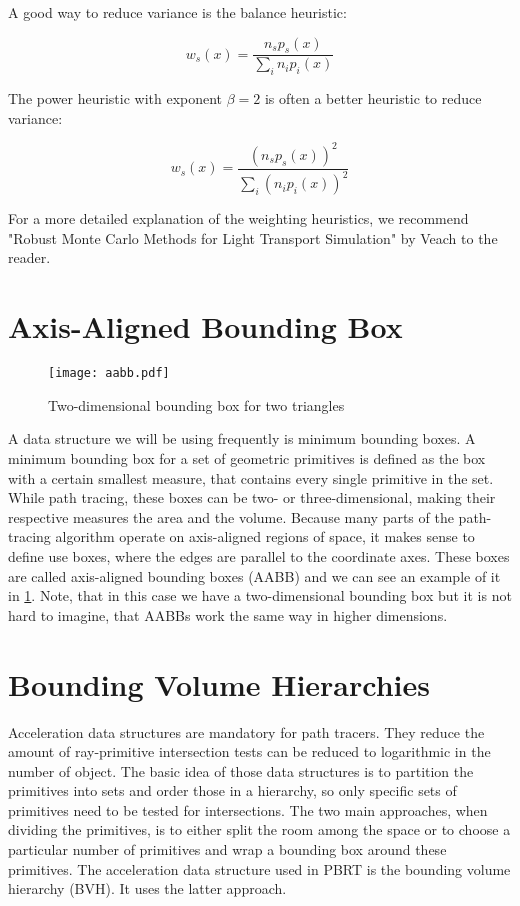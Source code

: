 A good way to reduce variance is the balance heuristic:

\begin{equation}
w_s(x) = \frac{n_s p_s(x)}{\sum_{i}n_i p_i(x)}
\end{equation}

The power heuristic with exponent $\beta = 2$ is often a better heuristic to reduce variance:

\begin{equation}
w_s(x) = \frac{(n_s p_s(x))^2}{\sum_{i}(n_i p_i(x))^2}
\end{equation}

For a more detailed explanation of the weighting heuristics, we recommend "Robust Monte Carlo Methods for Light Transport Simulation" by Veach to the reader. \cite{RMCM}

\section{Axis-Aligned Bounding Box}
\begin{figure}
	\begin{center}
		\texttt{[image: aabb.pdf]}
		\caption{Two-dimensional bounding box for two triangles}
		\label{fig:aabb}
	\end{center}
\end{figure}

A data structure we will be using frequently is minimum bounding boxes. A minimum bounding box for a set of geometric primitives is defined as the box with a certain smallest measure, that contains every single primitive in the set. While path tracing, these boxes can be two- or three-dimensional, making their respective measures the area and the volume. Because many parts of the path-tracing algorithm operate on axis-aligned regions of space, it makes sense to define use boxes, where the edges are parallel to the coordinate axes. These boxes are called axis-aligned bounding boxes (AABB) and we can see an example of it in {\ref{fig:aabb}}. Note, that in this case we have a two-dimensional bounding box but it is not hard to imagine, that AABBs work the same way in higher dimensions.

\section{Bounding Volume Hierarchies}
\label{sec:preliminaries:bvh}

Acceleration data structures are mandatory for path tracers. They reduce the amount of ray-primitive intersection tests can be reduced to logarithmic in the number of object. The basic idea of those data structures is to partition the primitives into sets and order those in a hierarchy, so only specific sets of primitives need to be tested for intersections. The two main approaches, when dividing the primitives, is to either split the room among the space or to choose a particular number of primitives and wrap a bounding box around these primitives. The acceleration data structure used in PBRT is the bounding volume hierarchy (BVH). It uses the latter approach.

